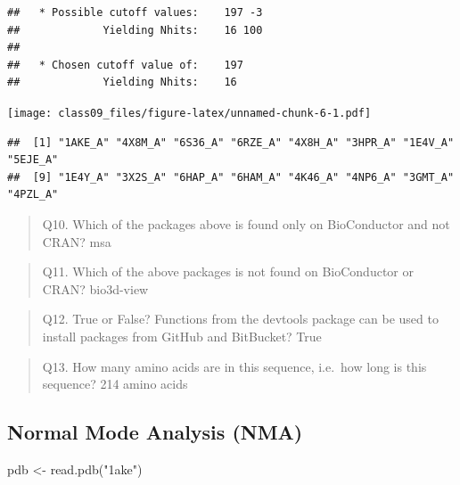 \documentclass[
]{article}
\newenvironment{Shaded}{\begin{snugshade}}{\end{snugshade}}
\newcommand{\FunctionTok}[1]{\textcolor[rgb]{0.00,0.00,0.00}{#1}}
\newcommand{\NormalTok}[1]{#1}
\newcommand{\OtherTok}[1]{\textcolor[rgb]{0.56,0.35,0.01}{#1}}
\newcommand{\SpecialCharTok}[1]{\textcolor[rgb]{0.00,0.00,0.00}{#1}}
\newcommand{\StringTok}[1]{\textcolor[rgb]{0.31,0.60,0.02}{#1}}
\begin{document}
\begin{verbatim}
##   * Possible cutoff values:    197 -3 
##             Yielding Nhits:    16 100 
## 
##   * Chosen cutoff value of:    197 
##             Yielding Nhits:    16
\end{verbatim}

\texttt{[image: class09\_files/figure-latex/unnamed-chunk-6-1.pdf]}

\begin{Shaded}
\end{Shaded}

\begin{verbatim}
##  [1] "1AKE_A" "4X8M_A" "6S36_A" "6RZE_A" "4X8H_A" "3HPR_A" "1E4V_A" "5EJE_A"
##  [9] "1E4Y_A" "3X2S_A" "6HAP_A" "6HAM_A" "4K46_A" "4NP6_A" "3GMT_A" "4PZL_A"
\end{verbatim}

\begin{quote}
Q10. Which of the packages above is found only on BioConductor and not
CRAN? msa
\end{quote}

\begin{quote}
Q11. Which of the above packages is not found on BioConductor or CRAN?
bio3d-view
\end{quote}

\begin{quote}
Q12. True or False? Functions from the devtools package can be used to
install packages from GitHub and BitBucket? True
\end{quote}

\begin{quote}
Q13. How many amino acids are in this sequence, i.e.~how long is this
sequence? 214 amino acids
\end{quote}

\hypertarget{normal-mode-analysis-nma}{%
\subsection{Normal Mode Analysis (NMA)}\label{normal-mode-analysis-nma}}

\begin{Shaded}
\begin{Highlighting}[]
\NormalTok{pdb }\OtherTok{\textless{}{-}} \FunctionTok{read.pdb}\NormalTok{(}\StringTok{"1ake"}\NormalTok{)}
\end{Highlighting}
\end{Shaded}
\end{document}
